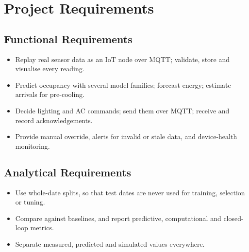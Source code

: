 \documentclass[12pt,a4paper,oneside]{report}
\begin{document}
\section{Project Requirements}
\subsection{Functional Requirements}
\begin{itemize}
\item Replay real sensor data as an IoT node over MQTT; validate, store and visualise every reading.
\item Predict occupancy with several model families; forecast energy; estimate arrivals for pre-cooling.
\item Decide lighting and AC commands; send them over MQTT; receive and record acknowledgements.
\item Provide manual override, alerts for invalid or stale data, and device-health monitoring.
\end{itemize}
\subsection{Analytical Requirements}
\begin{itemize}
\item Use whole-date splits, so that test dates are never used for training, selection or tuning.
\item Compare against baselines, and report predictive, computational and closed-loop metrics.
\item Separate measured, predicted and simulated values everywhere.
\end{itemize}
\end{document}

